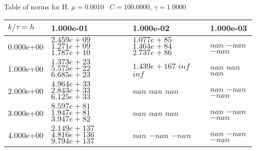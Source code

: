 \begin{center}
Table of norms for H. $\mu = 0.0010$ \, $C = 100.0000$, $\gamma = 1.0000$
  
\begin{tabular}{|p{1in}|p{1in}|p{1in}|p{1in}|} \hline
$k / \tau = h$ &1.000e-01 &1.000e-02 &1.000e-03 \\ \hline 
0.000e+00 & $2.459e+09$  $1.271e+09$  $1.787e+10$  & $1.077e+85$  $1.464e+84$  $2.737e+86$  & $nan$  $-nan$  $-nan$  \\ \hline 
1.000e+00 & $1.373e+23$  $5.575e+22$  $6.685e+23$  & $1.439e+167$  $inf$  $inf$  & $nan$  $nan$  $nan$  \\ \hline 
2.000e+00 & $4.964e+33$  $2.843e+33$  $6.125e+33$  & $nan$  $nan$  $nan$  & $nan$  $-nan$  $-nan$  \\ \hline 
3.000e+00 & $8.597e+81$  $1.947e+81$  $3.947e+82$  & $nan$  $nan$  $nan$  & $nan$  $-nan$  $-nan$  \\ \hline 
4.000e+00 & $2.149e+137$  $4.816e+136$  $9.794e+137$  & $nan$  $-nan$  $-nan$  & $nan$  $-nan$  $-nan$  \\ \hline 

\end{tabular}\\[20pt]
\end{center}
